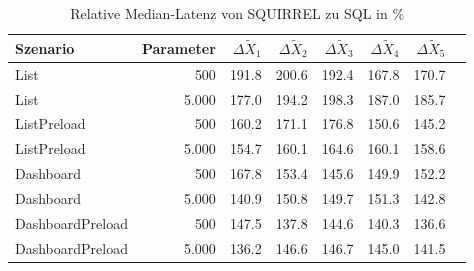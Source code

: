 
\begin{table}[ht]
\setlength{\extrarowheight}{-1pt}
\centering
\caption{Relative Median-Latenz von SQUIRREL zu SQL in \%}
\begin{tabular}{lrrrrrrr}
\toprule
Szenario & Parameter & ${\Delta \tilde{X}_1}$ & ${\Delta \tilde{X}_2}$ & ${\Delta \tilde{X}_3}$ & ${\Delta \tilde{X}_4}$ & ${\Delta \tilde{X}_5}$ \\
\midrule
	List & 500 & \cellcolor{red!46}  191.8 & \cellcolor{red!50}  200.6 & \cellcolor{red!46}  192.4 & \cellcolor{red!34}  167.8 & \cellcolor{red!35}  170.7 \\
	List & 5.000 & \cellcolor{red!39}  177.0 & \cellcolor{red!47}  194.2 & \cellcolor{red!49}  198.3 & \cellcolor{red!44}  187.0 & \cellcolor{red!43}  185.7 \\
	ListPreload & 500 & \cellcolor{red!30}  160.2 & \cellcolor{red!36}  171.1 & \cellcolor{red!38}  176.8 & \cellcolor{red!25}  150.6 & \cellcolor{red!23}  145.2 \\
	ListPreload & 5.000 & \cellcolor{red!27}  154.7 & \cellcolor{red!30}  160.1 & \cellcolor{red!32}  164.6 & \cellcolor{red!30}  160.1 & \cellcolor{red!29}  158.6 \\
	Dashboard & 500 & \cellcolor{red!34}  167.8 & \cellcolor{red!27}  153.4 & \cellcolor{red!23}  145.6 & \cellcolor{red!25}  149.9 & \cellcolor{red!26}  152.2 \\
	Dashboard & 5.000 & \cellcolor{red!20}  140.9 & \cellcolor{red!25}  150.8 & \cellcolor{red!25}  149.7 & \cellcolor{red!26}  151.3 & \cellcolor{red!21}  142.8 \\
	DashboardPreload & 500 & \cellcolor{red!24}  147.5 & \cellcolor{red!19}  137.8 & \cellcolor{red!22}  144.6 & \cellcolor{red!20}  140.3 & \cellcolor{red!18}  136.6 \\
	DashboardPreload & 5.000 & \cellcolor{red!18}  136.2 & \cellcolor{red!23}  146.6 & \cellcolor{red!23}  146.7 & \cellcolor{red!22}  145.0 & \cellcolor{red!21}  141.5 \\
\bottomrule
\end{tabular}
\label{tab:relative_latenz_squirrel}
\end{table}
	
